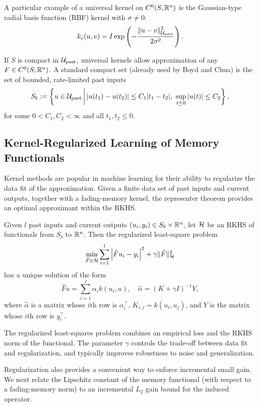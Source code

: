 A particular example of a universal kernel on $C^0(S,\mathbb{R}^n)$ is the Gaussian-type radial basis function (RBF) kernel with $\sigma\neq0$:
$$
k_e(u,v)=I\operatorname{exp}\left(-\frac{\|u-v\|_{{\cal U}_\text{past}}^2}{2\sigma^2}\right).
$$

If $S$ is compact in ${\cal U}_\text{past}$, universal kernels allow approximation of any $F\in C^0(S,\mathbb{R}^n)$. A standard compact set (already used by Boyd and Chua) is the set of bounded, rate-limited past inputs
$$
S_b:=\left\{u\in {\cal U}_\text{past}\,\middle|\,|u(t_1)-u(t_2)|\le C_1|t_1-t_2|,\ \sup_{t\le 0} |u(t)|\le C_2\right\},
$$
for some $0<C_1,C_2<\infty$ and all $t_1,t_2\leq 0$.

\subsection{Kernel-Regularized Learning of Memory Functionals}
Kernel methods are popular in machine learning for their ability to regularize the data fit of the approximation. Given a finite data set of past inputs and current outputs, together with a fading-memory kernel, the representer theorem provides an optimal approximant within the RKHS.

\begin{theorem}
Given $l$ past inputs and current outputs $(u_i,y_i) \in S_b \times \mathbb{R}^n$, let $\mathcal{H}$ be an RKHS of functionals from $S_b$ to $\mathbb{R}^n$. Then the regularized least-square problem
$$
\min_{\hat F \in {\cal H}} \sum_{i=1}^{l}\left|\hat{F}u_{i}-y_i\right|^2+\gamma\|\hat{F}\|^2_{\mathcal{H}}
$$
has a unique solution of the form
$$
\hat{F}u=\sum_{i=1}^{l}\alpha_ik(u_{i},u),\quad \hat{\alpha}=(K+\gamma I)^{-1}Y,
$$
where $\hat{\alpha}$ is a matrix whose $i$th row is $\alpha_i^\top$, $K_{i,j}=k(u_{i},u_{j})$, and $Y$ is the matrix whose $i$th row is $y_i^\top$.
\end{theorem}

The regularized least-squares problem combines an empirical loss and the RKHS norm of the functional. The parameter $\gamma$ controls the trade-off between data fit and regularization, and typically improves robustness to noise and generalization.

Regularization also provides a convenient way to enforce incremental small gain. We next relate the Lipschitz constant of the memory functional (with respect to a fading-memory norm) to an incremental $L_2$ gain bound for the induced operator.

